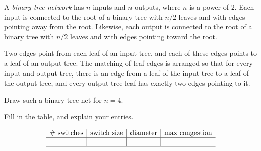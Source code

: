 \begin{problem}
A \emph{binary-tree network} has $n$ inputs and $n$ outputs, where $n$ is
a power of 2.  Each input is connected to the root of a binary tree with
$n/2$ leaves and with edges pointing away from the root.  Likewise, each
output is connected to the root of a binary tree with $n/2$ leaves and
with edges pointing toward the root.

Two edges point from each leaf of an input tree, and each of these edges
points to a leaf of an output tree.  The matching of leaf edges is
arranged so that for every input and output tree, there is an edge from a
leaf of the input tree to a leaf of the output tree, and every output tree
leaf has exactly two edges pointing to it.

\bparts
\ppart Draw such a binary-tree net for $n=4$.

\begin{solution}

\begin{figure}[h]
\end{figure}

\end{solution}


\ppart Fill in the table, and explain your entries.

{\large
\[
\begin{array}{c|c|c|c}
\text{\# switches} &
\text{switch size} &
\text{diameter} &
\text{max congestion} \\ \hline
&&&\\ \hline
\end{array}
\]
}

\begin{solution}

{\large
\[
\begin{array}{c|c|c|c}
\text{\# switches} &
\text{switch size} &
\text{diameter} &
\text{max congestion} \\ \hline
2n(n-1)& 1 \times 2, 2 \times 1 & 1+ 2\log n & 1\\ \hline
\end{array}
\]

\end{solution}

\iffalse
\begin{align*}
\text{\# switches } & = 2n(n-1)\\
\text{switch size} & = 1 \times 2, 2 \times 1\\
\text{diameter} & =  1+ 2\log n\\
\text{max congestion} & =1
\end{align*}
\fi


\end{problem}
